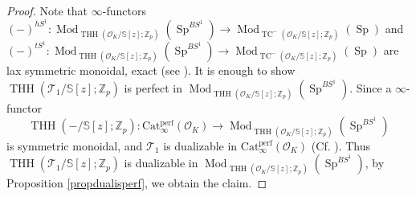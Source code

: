 \documentclass[11pt]{amsart}
\newcommand{\Z}{\mathbb{Z}}
\newcommand{\sO}{\mathcal{O}}
\newcommand{\sT}{\mathcal{T}}
\newcommand{\bS}{\mathbb{S}}
\newcommand{\Mod}{\operatorname{Mod}}
\newcommand{\THH}{\operatorname{THH}}
\newcommand{\TCn}{\operatorname{TC}^{-}}
\newcommand{\Cat}{\operatorname{Cat_{\infty}^{perf}}}
\newcommand{\Sp}{\operatorname{Sp}}
\theoremstyle{definition}
\theoremstyle{remark}
\numberwithin{equation}{section}
\begin{document}
\begin{proof}
Note that $\infty$-functors $(-)^{hS^1}:\Mod_{\THH(\sO_K/\bS[z];\Z_p)}(\Sp^{BS^1}) \to \Mod_{\TCn(\sO_K/\bS[z];\Z_p)}(\Sp)$ and $(-)^{tS^1}:\Mod_{\THH(\sO_K/\bS[z];\Z_p)}(\Sp^{BS^1}) \to \Mod_{\TCn(\sO_K/\bS[z];\Z_p)}(\Sp)$ are lax symmetric monoidal, exact (see \cite[Corollary I.4.3]{NS18}). It is enough to show $\THH(\sT_1/\bS[z];\Z_p)$ is perfect in $\Mod_{\THH(\sO_K/\bS[z];\Z_p)}(\Sp^{BS^1})$. Since a $\infty$-functor
\[
\THH(-/\bS[z];\Z_p): \Cat(\sO_K) \to\Mod_{\THH(\sO_K/\bS[z];\Z_p)}(\Sp^{BS^1})
\]
is symmetric monoidal, and $\sT_1$ is dualizable in $\Cat(\sO_K)$ (Cf. \cite[Ch. 11]{Lurie17}). Thus $\THH(\sT_1/\bS[z];\Z_p)$ is dualizable in $\Mod_{\THH(\sO_K/\bS[z];\Z_p)}(\Sp^{BS^1})$, by Proposition \ref{propdualisperf}, we obtain the claim. 
\end{proof}
\end{document}

